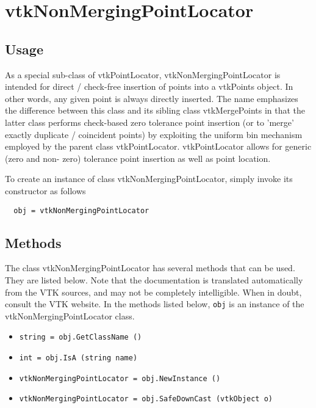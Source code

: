 \section{vtkNonMergingPointLocator}

\subsection{Usage}

  As a special sub-class of vtkPointLocator, vtkNonMergingPointLocator is
  intended for direct / check-free insertion of points into a vtkPoints 
  object. In other words, any given point is always directly inserted. 
  The name emphasizes the difference between this class and its sibling 
  class vtkMergePoints in that the latter class performs check-based zero 
  tolerance point insertion (or to 'merge' exactly duplicate / coincident
  points) by exploiting the uniform bin mechanism employed by the parent 
  class vtkPointLocator. vtkPointLocator allows for generic (zero and non-
  zero) tolerance point insertion as well as point location.


To create an instance of class vtkNonMergingPointLocator, simply
invoke its constructor as follows
\begin{verbatim}
  obj = vtkNonMergingPointLocator
\end{verbatim}
\subsection{Methods}

The class vtkNonMergingPointLocator has several methods that can be used.
  They are listed below.
Note that the documentation is translated automatically from the VTK sources,
and may not be completely intelligible.  When in doubt, consult the VTK website.
In the methods listed below, \verb|obj| is an instance of the vtkNonMergingPointLocator class.
\begin{itemize}
\item  \verb|string = obj.GetClassName ()|

\item  \verb|int = obj.IsA (string name)|

\item  \verb|vtkNonMergingPointLocator = obj.NewInstance ()|

\item  \verb|vtkNonMergingPointLocator = obj.SafeDownCast (vtkObject o)|

\end{itemize}
